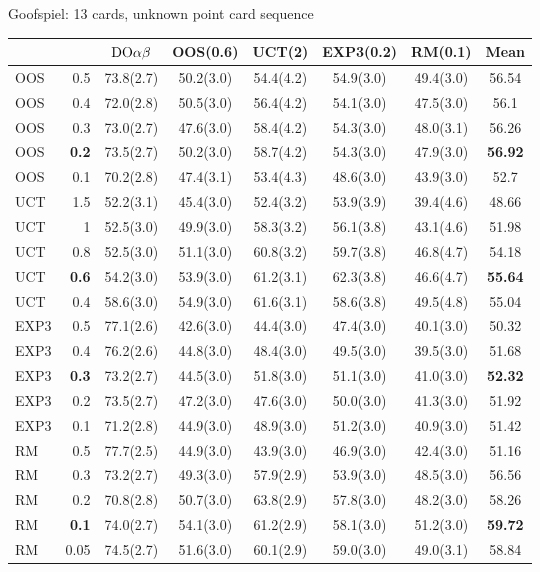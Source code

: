 \begin{table}
\centering
\begin{scriptsize}

Goofspiel: 13 cards, unknown point card sequence
\begin{tabular}{|lr|ccccc|c|}\hline
&&$\textrm{DO}\alpha\beta$&OOS(0.6)&UCT(2)&EXP3(0.2)&RM(0.1)&Mean\\\hline
OOS&0.5&73.8(2.7)&50.2(3.0)&54.4(4.2)&54.9(3.0)&49.4(3.0)&56.54\\
OOS&0.4&72.0(2.8)&50.5(3.0)&56.4(4.2)&54.1(3.0)&47.5(3.0)&56.1\\
OOS&0.3&73.0(2.7)&47.6(3.0)&58.4(4.2)&54.3(3.0)&48.0(3.1)&56.26\\
OOS&\textbf{0.2}&73.5(2.7)&50.2(3.0)&58.7(4.2)&54.3(3.0)&47.9(3.0)&\textbf{56.92}\\
OOS&0.1&70.2(2.8)&47.4(3.1)&53.4(4.3)&48.6(3.0)&43.9(3.0)&52.7\\\hline
UCT&1.5&52.2(3.1)&45.4(3.0)&52.4(3.2)&53.9(3.9)&39.4(4.6)&48.66\\
UCT&1&52.5(3.0)&49.9(3.0)&58.3(3.2)&56.1(3.8)&43.1(4.6)&51.98\\
UCT&0.8&52.5(3.0)&51.1(3.0)&60.8(3.2)&59.7(3.8)&46.8(4.7)&54.18\\
UCT&\textbf{0.6}&54.2(3.0)&53.9(3.0)&61.2(3.1)&62.3(3.8)&46.6(4.7)&\textbf{55.64}\\
UCT&0.4&58.6(3.0)&54.9(3.0)&61.6(3.1)&58.6(3.8)&49.5(4.8)&55.04\\\hline
EXP3&0.5&77.1(2.6)&42.6(3.0)&44.4(3.0)&47.4(3.0)&40.1(3.0)&50.32\\
EXP3&0.4&76.2(2.6)&44.8(3.0)&48.4(3.0)&49.5(3.0)&39.5(3.0)&51.68\\
EXP3&\textbf{0.3}&73.2(2.7)&44.5(3.0)&51.8(3.0)&51.1(3.0)&41.0(3.0)&\textbf{52.32}\\
EXP3&0.2&73.5(2.7)&47.2(3.0)&47.6(3.0)&50.0(3.0)&41.3(3.0)&51.92\\
EXP3&0.1&71.2(2.8)&44.9(3.0)&48.9(3.0)&51.2(3.0)&40.9(3.0)&51.42\\\hline
RM&0.5&77.7(2.5)&44.9(3.0)&43.9(3.0)&46.9(3.0)&42.4(3.0)&51.16\\
RM&0.3&73.2(2.7)&49.3(3.0)&57.9(2.9)&53.9(3.0)&48.5(3.0)&56.56\\
RM&0.2&70.8(2.8)&50.7(3.0)&63.8(2.9)&57.8(3.0)&48.2(3.0)&58.26\\
RM&\textbf{0.1}&74.0(2.7)&54.1(3.0)&61.2(2.9)&58.1(3.0)&51.2(3.0)&\textbf{59.72}\\
RM&0.05&74.5(2.7)&51.6(3.0)&60.1(2.9)&59.0(3.0)&49.0(3.1)&58.84\\
\hline
\end{tabular}


\end{scriptsize}
\end{table}
